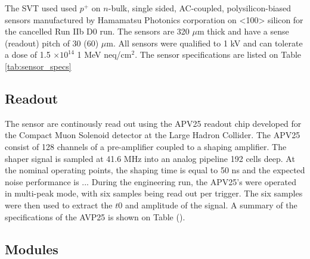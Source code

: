The SVT used used $p^{+}$ on $n$-bulk, single sided, AC-coupled, 
polysilicon-biased sensors manufactured by Hamamatsu Photonics
corporation on <100> silicon for the cancelled Run IIb D0 run.
The sensors are 320 $\mu$m thick and have 
a sense (readout) pitch of 30 (60) $\mu$m. All sensors were qualified to 
1 kV and can tolerate a dose of 1.5 $\times 10^{14}$ 1 MeV neq/cm$^{2}$.  The 
sensor specifications are listed on Table \ref{tab:sensor_specs}


\subsection*{Readout}

The sensor are continously read out using the APV25 readout chip developed for
the Compact Muon Solenoid detector at the Large Hadron Collider.  The APV25
consist of 128 channels of a pre-amplifier coupled to a shaping amplifier. The
shaper signal is sampled at 41.6 MHz into an analog pipeline 192 cells deep.
At the nominal operating points, the shaping time is equal to 50 ns and the
expected noise performance is ...  During the engineering run, the APV25's
were operated in multi-peak mode, with six samples being read out per 
trigger.  The six samples were then used to extract the $t0$ and amplitude 
of the signal.  A summary of the specifications of the AVP25 is shown
on Table ().

\subsection*{Modules}

